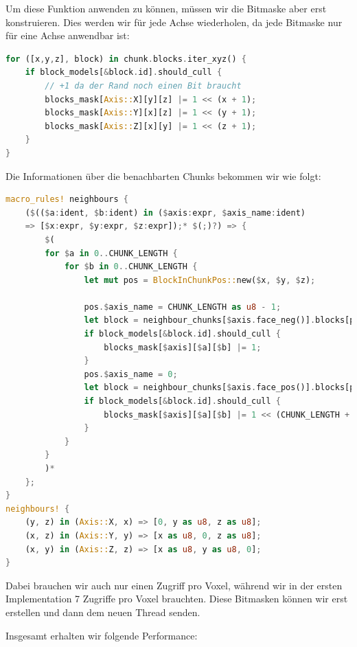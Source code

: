 Um diese Funktion anwenden zu können, müssen
wir die Bitmaske aber erst konstruieren.
Dies werden wir für jede Achse wiederholen,
da jede Bitmaske nur für eine Achse anwendbar ist:

\begin{lstlisting}[language=Rust]
for ([x,y,z], block) in chunk.blocks.iter_xyz() {
	if block_models[&block.id].should_cull {
		// +1 da der Rand noch einen Bit braucht
		blocks_mask[Axis::X][y][z] |= 1 << (x + 1);
		blocks_mask[Axis::Y][x][z] |= 1 << (y + 1);
		blocks_mask[Axis::Z][x][y] |= 1 << (z + 1);
	}
}
\end{lstlisting}

Die Informationen über die benachbarten Chunks
bekommen wir wie folgt:

\begin{lstlisting}[language=Rust]
macro_rules! neighbours {
	($(($a:ident, $b:ident) in ($axis:expr, $axis_name:ident)
	=> [$x:expr, $y:expr, $z:expr]);* $(;)?) => {
		$(
		for $a in 0..CHUNK_LENGTH {
			for $b in 0..CHUNK_LENGTH {
				let mut pos = BlockInChunkPos::new($x, $y, $z);

				pos.$axis_name = CHUNK_LENGTH as u8 - 1;
				let block = neighbour_chunks[$axis.face_neg()].blocks[pos];
				if block_models[&block.id].should_cull {
					blocks_mask[$axis][$a][$b] |= 1;
				}
				pos.$axis_name = 0;
				let block = neighbour_chunks[$axis.face_pos()].blocks[pos];
				if block_models[&block.id].should_cull {
					blocks_mask[$axis][$a][$b] |= 1 << (CHUNK_LENGTH + 1);
				}
			}
		}
		)*
	};
}
neighbours! {
	(y, z) in (Axis::X, x) => [0, y as u8, z as u8];
	(x, z) in (Axis::Y, y) => [x as u8, 0, z as u8];
	(x, y) in (Axis::Z, z) => [x as u8, y as u8, 0];
}
\end{lstlisting}

Dabei brauchen wir auch nur einen Zugriff pro Voxel,
während wir in der ersten Implementation 7 Zugriffe
pro Voxel brauchten.
Diese Bitmasken können wir erst erstellen und
dann dem neuen Thread senden.

Insgesamt erhalten wir folgende Performance:

\vspace{0.3cm}


